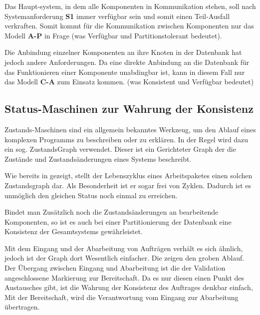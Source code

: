 Das Haupt-system, in dem alle Komponenten in Kommunikation stehen,
soll nach Systemanforderung \textbf{S1} immer verfügbar sein und somit einen Teil-Ausfall  verkraften.
Somit kommt für die Kommunikation zwischen Komponenten nur das Modell \textbf{A-P} in Frage
(was Verfügbar und Partitionstolerant bedeutet).

Die Anbindung einzelner Komponenten an ihre Knoten in der Datenbank hat jedoch andere Anforderungen.
Da eine direkte Anbindung an die Datenbank für das Funktionieren einer Komponente unabdingbar ist,
kann in diesem Fall nur das Modell \textbf{C-A} zum Einsatz kommen.
(was Konsistent und Verfügbar bedeutet)



\subsection{Status-Maschinen zur Wahrung der Konsistenz}

\nocite{statechart}

Zustands-Maschinen sind ein allgemein bekanntes Werkzeug,
um den Ablauf eines komplexen Programms zu beschreiben oder zu erklären.
In der Regel wird dazu ein sog. ZustandsGraph verwendet.
Dieser ist ein Gerichteter Graph der die Zustände und Zustandsänderungen eines Systems beschreibt.

Wie bereits in  gezeigt,
stellt der Lebenszyklus eines Arbeitspaketes einen solchen Zustandsgraph dar.
Als Besonderheit ist er sogar frei von Zyklen.
Dadurch ist es unmöglich den gleichen Status noch einmal zu erreichen.

Bindet man Zusätzlich noch die Zustandsänderungen an bearbeitende Komponenten,
so ist es auch bei einer Partitionierung der Datenbank eine Konsistenz der Gesamtsystems gewährleistet.


Mit dem Eingang und der Abarbeitung von Aufträgen verhält es sich ähnlich,
jedoch ist der Graph dort Wesentlich einfacher.
Die  zeigen den groben Ablauf.
Der Übergang zwischen Eingang und Abarbeitung ist die der Validation angeschlossene Markierung zur Bereitschaft.
Da es nur diesen einen Punkt des Austausches gibt, ist die Wahrung der Konsistenz des Auftrages denkbar einfach,
Mit der Bereitschaft, wird die Verantwortung vom Eingang zur Abarbeitung übertragen.

